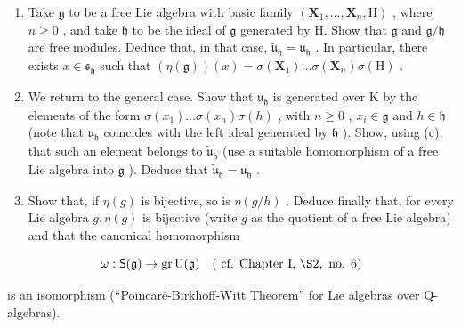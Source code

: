 \begin{enumerate}
\def\labelenumi{(\alph{enumi})}
\setcounter{enumi}{2}
\item
  Take \(\mathfrak{g}\) to be a free Lie algebra with basic family \((\mathbf{X}_1, \ldots, \mathbf{X}_n, \mathrm{H})\) , where \(n \geqslant 0\) , and take \(\mathfrak{h}\) to be the ideal of \(\mathfrak{g}\) generated by H. Show that \(\mathfrak{g}\) and \(\mathfrak{g} / \mathfrak{h}\) are free modules. Deduce that, in that case, \(\tilde{\mathfrak{u}}_{\mathfrak{h}} = \mathfrak{u}_{\mathfrak{h}}\) . In particular, there exists \(x \in \mathfrak{s}_{\mathfrak{h}}\) such that \((\eta(\mathfrak{g}))(x) = \sigma(\mathbf{X}_1) \ldots \sigma(\mathbf{X}_n) \sigma(\mathrm{H})\) .
\item
  We return to the general case. Show that \(\mathfrak{u}_{\mathfrak{h}}\) is generated over \(\mathrm{K}\) by the elements of the form \(\sigma(x_1) \ldots \sigma(x_n)\sigma(h)\) , with \(n \geqslant 0\) , \(x_i \in \mathfrak{g}\) and \(h \in \mathfrak{h}\) (note that \(\mathfrak{u}_{\mathfrak{h}}\) coincides with the left ideal generated by \(\mathfrak{h}\) ). Show, using (c), that such an element belongs to \(\tilde{\mathfrak{u}}_{\mathfrak{h}}\) (use a suitable homomorphism of a free Lie algebra into \(\mathfrak{g}\) ). Deduce that \(\tilde{\mathfrak{u}}_{\mathfrak{h}} = \mathfrak{u}_{\mathfrak{h}}\) .
\item
  Show that, if \(\eta(g)\) is bijective, so is \(\eta(g/h)\) . Deduce finally that, for every Lie algebra \(g, \eta(g)\) is bijective (write \(g\) as the quotient of a free Lie algebra) and that the canonical homomorphism
\end{enumerate}

\[
\omega : \mathsf {S} (\mathfrak {g}) \to \operatorname{gr} \mathrm{U} (\mathfrak {g}) \quad (\text { cf.   Chapter   I,   } \S 2, \text {   no.   } 6)
\]

is an isomorphism (``Poincaré-Birkhoff-Witt Theorem'' for Lie algebras over Q-algebras).

